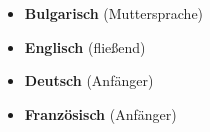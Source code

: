 
\begin{itemize}[leftmargin=1.2em, itemsep=2pt]
	\item \textbf{Bulgarisch} (Muttersprache)
	\item \textbf{Englisch} (fließend)
	\item \textbf{Deutsch} (Anfänger)
	\item \textbf{Französisch} (Anfänger)
\end{itemize}
